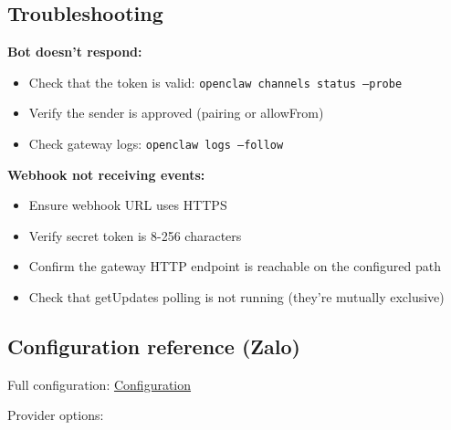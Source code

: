\subsection{Troubleshooting}


\textbf{Bot doesn't respond:}

\begin{itemize}
  \item Check that the token is valid: \texttt{openclaw channels status --probe}
  \item Verify the sender is approved (pairing or allowFrom)
  \item Check gateway logs: \texttt{openclaw logs --follow}
\end{itemize}


\textbf{Webhook not receiving events:}

\begin{itemize}
  \item Ensure webhook URL uses HTTPS
  \item Verify secret token is 8-256 characters
  \item Confirm the gateway HTTP endpoint is reachable on the configured path
  \item Check that getUpdates polling is not running (they're mutually exclusive)
\end{itemize}


\subsection{Configuration reference (Zalo)}


Full configuration: \href{/gateway/configuration}{Configuration}

Provider options:

